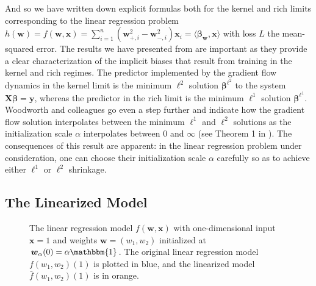 \documentclass{article}
\begin{document}
And so we have written down explicit formulas both for the kernel and rich limits corresponding to the linear regression problem $h(\boldsymbol{w}) = f(\boldsymbol{w}, \boldsymbol{x}) = \sum_{i=1}^n(\boldsymbol{w}_{+, i}^2 - \boldsymbol{w}_{-, i}^2)\boldsymbol{x}_i = \langle \boldsymbol{\beta}_{\boldsymbol{w}}, \boldsymbol{x} \rangle $ with loss $L$ the mean-squared error. The results we have presented from \cite{woodworth2020kernel} are important as they provide a clear characterization of the implicit biases that result from training in the kernel and rich regimes. The predictor implemented by the gradient flow dynamics in the kernel limit is the minimum $\ell^2$ solution $\boldsymbol{\beta}^{\ell^2}$ to the system $\boldsymbol{X} \boldsymbol{\beta} = \boldsymbol{y}$, whereas the predictor in the rich limit is the minimum $\ell^1$ solution $\boldsymbol{\beta}^{\ell^1}$. Woodworth and colleagues go even a step further and indicate how the gradient flow solution interpolates between the minimum $\ell^1$ and $\ell^2 $ solutions as the initialization scale $\alpha$ interpolates between $0$ and $\infty$ (see Theorem 1 in \cite{woodworth2020kernel}). The consequences of this result are apparent: in the linear regression problem under consideration, one can choose their initialization scale $\alpha$ carefully so as to achieve either $\ell^1$ or $\ell^2$ shrinkage.

\subsection{The Linearized Model}

\begin{figure}[H]
    \centering
    \hfill
    \caption{The linear regression model $f(\boldsymbol{w}, \boldsymbol{x})$ with one-dimensional input $\boldsymbol{x} = 1$ and weights $\boldsymbol{w} = (w_1, w_2)$ initialized at $\boldsymbol{w}_{\alpha}(0) = \alpha \mathbbm{1}$. The original linear regression model $f(w_1, w_2)(1)$ is plotted in blue, and the linearized model $\bar{f}(w_1, w_2)(1)$ is in orange.}\label{img:linearization}
\end{figure}
\end{document}
